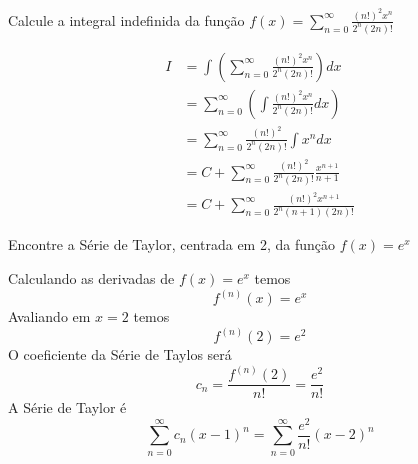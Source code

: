\documentclass[a4paper,12pt,fleqn]{article}
\begin{document}
Calcule a integral indefinida da função
\(
  f(x) = \sum_{n=0}^\infty \frac{(n!)^2x^n}{2^n(2n)!}
\)

\begin{answer}
  \begin{align*}
    I
    & = \int \left(\sum_{n=0}^\infty \frac{(n!)^2x^n}{2^n(2n)!}\right) dx \\[2mm]
    & = \sum_{n=0}^\infty \left(\int \frac{(n!)^2x^n}{2^n(2n)!} dx\right) \\[2mm]
    & = \sum_{n=0}^\infty \frac{(n!)^2}{2^n(2n)!} \int x^n dx \\[2mm]
    & = C + \sum_{n=0}^\infty \frac{(n!)^2}{2^n(2n)!} \frac{x^{n+1}}{n+1} \\[2mm]
    & = C + \sum_{n=0}^\infty \frac{(n!)^2x^{n+1}}{2^n(n+1)(2n)!}
  \end{align*}
  \clearpage
\end{answer}

Encontre a Série de Taylor, centrada em 2, da função \( f(x) = e^x \)

\begin{answer}
  Calculando as derivadas de
  \( f(x) = e^x\)
  temos
  \[
    f^{(n)}(x) = e^x
  \]
  Avaliando em $x=2$ temos
  \[
    f^{(n)}(2) = e^2
  \]
  O coeficiente da Série de Taylos será
  \[
    c_n
    = \frac{f^{(n)}(2)}{n!}
    = \frac{e^2}{n!}
  \]
  A Série de Taylor é
  \[
    \sum_{n=0}^\infty c_n (x-1)^n
    = \sum_{n=0}^\infty \frac{e^2}{n!} (x-2)^n
  \]
\end{answer}

\end{document}
